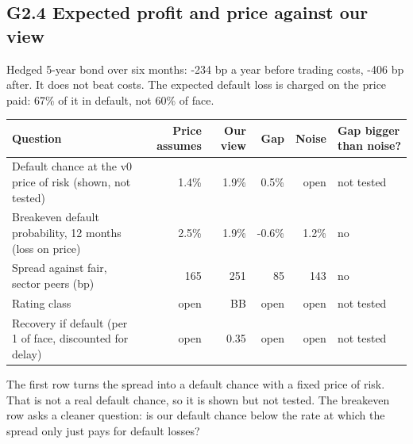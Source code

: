 \documentclass[11pt,a4paper]{article}
\begin{document}
\subsection*{G2.4 Expected profit and price against our view}
Hedged 5-year bond over six months: -234 bp a year before trading costs, -406 bp after. It does not beat costs. The expected default loss is charged on the price paid: 67\% of it in default, not 60\% of face.
\begin{center}\footnotesize\setlength{\tabcolsep}{3.5pt}\begin{tabular}{@{}p{5.2cm}rrrrl@{}}\toprule
Question & Price assumes & Our view & Gap & Noise & Gap bigger than noise? \\\midrule
Default chance at the v0 price of risk (shown, not tested) & 1.4\% & 1.9\% & 0.5\% & open & not tested \\
Breakeven default probability, 12 months (loss on price) & 2.5\% & 1.9\% & -0.6\% & 1.2\% & no \\
Spread against fair, sector peers (bp) & 165 & 251 & 85 & 143 & no \\
Rating class & open & BB & open & open & not tested \\
Recovery if default (per 1 of face, discounted for delay) & open & 0.35 & open & open & not tested \\
\bottomrule\end{tabular}\end{center}
The first row turns the spread into a default chance with a fixed price of risk. That is not a real default chance, so it is shown but not tested. The breakeven row asks a cleaner question: is our default chance below the rate at which the spread only just pays for default losses?
\end{document}
